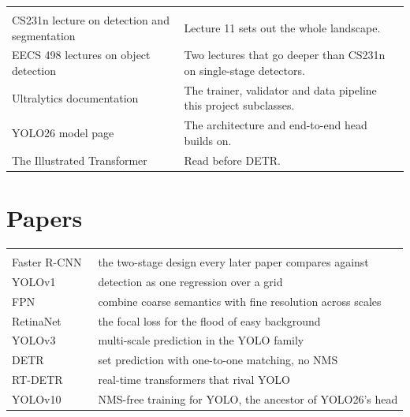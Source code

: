 \begin{tabularx}{\textwidth}{@{}P{5.2cm}L@{}}
 &  \\
CS231n lecture on detection and segmentation &  \newline Lecture 11 sets out the whole landscape. \\
EECS 498 lectures on object detection &  \newline Two lectures that go deeper than CS231n on single-stage detectors. \\
Ultralytics documentation &  \newline The trainer, validator and data pipeline this project subclasses. \\
YOLO26 model page &  \newline The architecture and end-to-end head \method{} builds on. \\
The Illustrated Transformer &  \newline Read before DETR. \\
\end{tabularx}

\section{Papers}

\begin{tabularx}{\textwidth}{@{}P{5.2cm}L@{}}
 &  \\
Faster R-CNN~\cite{ren2015fasterrcnn} & the two-stage design every later paper compares against \\
YOLOv1~\cite{redmon2016yolo} & detection as one regression over a grid \\
FPN~\cite{lin2017fpn} & combine coarse semantics with fine resolution across scales \\
RetinaNet~\cite{lin2017focal} & the focal loss for the flood of easy background \\
YOLOv3~\cite{redmon2018yolov3} & multi-scale prediction in the YOLO family \\
DETR~\cite{carion2020detr} & set prediction with one-to-one matching, no NMS \\
RT-DETR~\cite{zhao2024rtdetr} & real-time transformers that rival YOLO \\
YOLOv10~\cite{wang2024yolov10} & NMS-free training for YOLO, the ancestor of YOLO26's head \\
\end{tabularx}


